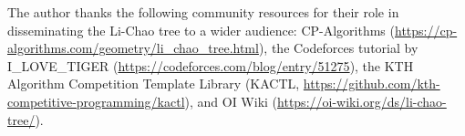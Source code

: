 \documentclass[11pt,a4paper]{article}
\theoremstyle{definition}
\theoremstyle{plain}
\begin{document}
The author thanks the following community resources for their role in disseminating the Li-Chao tree to a wider audience: CP-Algorithms (\url{https://cp-algorithms.com/geometry/li_chao_tree.html}), the Codeforces tutorial by I\_LOVE\_TIGER (\url{https://codeforces.com/blog/entry/51275}), the KTH Algorithm Competition Template Library (KACTL, \url{https://github.com/kth-competitive-programming/kactl}), and OI Wiki (\url{https://oi-wiki.org/ds/li-chao-tree/}).



\end{document}
